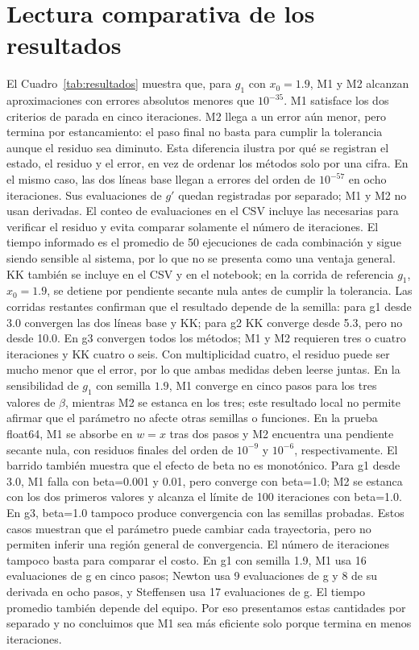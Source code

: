 \documentclass[10pt,a4paper]{article}
\begin{document}
\section{Lectura comparativa de los resultados}
El Cuadro~\ref{tab:resultados} muestra que, para $g_1$ con $x_0=1.9$, M1 y M2 alcanzan aproximaciones con errores absolutos menores que $10^{-35}$. M1 satisface los dos criterios de parada en cinco iteraciones. M2 llega a un error aún menor, pero termina por estancamiento: el paso final no basta para cumplir la tolerancia aunque el residuo sea diminuto. Esta diferencia ilustra por qué se registran el estado, el residuo y el error, en vez de ordenar los m\'etodos solo por una cifra.
En el mismo caso, las dos l\'ineas base llegan a errores del orden de $10^{-57}$ en ocho iteraciones. Sus evaluaciones de $g'$ quedan registradas por separado; M1 y M2 no usan derivadas. El conteo de evaluaciones en el CSV incluye las necesarias para verificar el residuo y evita comparar solamente el n\'umero de iteraciones. El tiempo informado es el promedio de 50 ejecuciones de cada combinación y sigue siendo sensible al sistema, por lo que no se presenta como una ventaja general. KK tambi\'en se incluye en el CSV y en el notebook; en la corrida de referencia $g_1$, $x_0=1.9$, se detiene por pendiente secante nula antes de cumplir la tolerancia.
Las corridas restantes confirman que el resultado depende de la semilla: para g1 desde 3.0 convergen las dos líneas base y KK; para g2 KK converge desde 5.3, pero no desde 10.0. En g3 convergen todos los métodos; M1 y M2 requieren tres o cuatro iteraciones y KK cuatro o seis. Con multiplicidad cuatro, el residuo puede ser mucho menor que el error, por lo que ambas medidas deben leerse juntas.
En la sensibilidad de $g_1$ con semilla $1.9$, M1 converge en cinco pasos para los tres valores de $\beta$, mientras M2 se estanca en los tres; este resultado local no permite afirmar que el par\'ametro no afecte otras semillas o funciones. En la prueba float64, M1 se absorbe en $w=x$ tras dos pasos y M2 encuentra una pendiente secante nula, con residuos finales del orden de $10^{-9}$ y $10^{-6}$, respectivamente.
El barrido también muestra que el efecto de beta no es monotónico. Para g1 desde 3.0, M1 falla con beta=0.001 y 0.01, pero converge con beta=1.0; M2 se estanca con los dos primeros valores y alcanza el límite de 100 iteraciones con beta=1.0. En g3, beta=1.0 tampoco produce convergencia con las semillas probadas. Estos casos muestran que el parámetro puede cambiar cada trayectoria, pero no permiten inferir una región general de convergencia.
El número de iteraciones tampoco basta para comparar el costo. En g1 con semilla 1.9, M1 usa 16 evaluaciones de g en cinco pasos; Newton usa 9 evaluaciones de g y 8 de su derivada en ocho pasos, y Steffensen usa 17 evaluaciones de g. El tiempo promedio también depende del equipo. Por eso presentamos estas cantidades por separado y no concluimos que M1 sea más eficiente solo porque termina en menos iteraciones.
\end{document}
